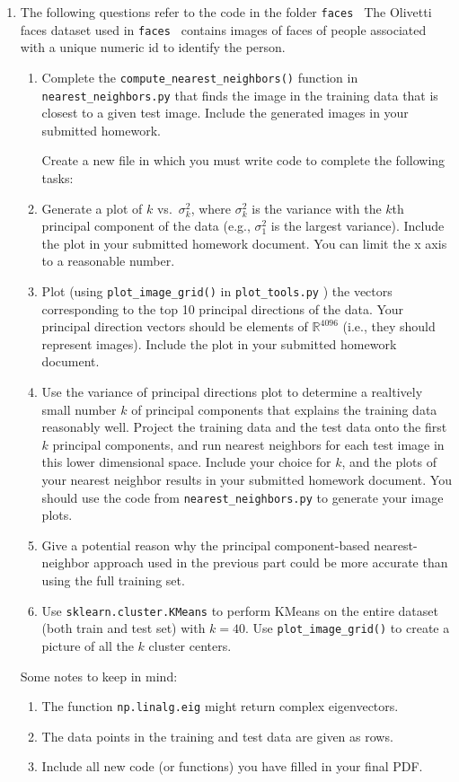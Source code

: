 \documentclass[12pt,twoside]{article}
\begin{document}
\begin{enumerate}
\item The following questions refer to the code in the folder {\tt faces }
  The Olivetti faces dataset used in  {\tt faces }  contains images of faces of people associated with a unique numeric id to identify the person.
 
\begin{enumerate}
\item  Complete the \verb|compute_nearest_neighbors()| function in \verb|nearest_neighbors.py| that finds the image in the training data that is closest to a given test image.  Include the generated images in your submitted homework.


\vspace{0.5cm}Create a new file  in which
you must write code to complete the following tasks:

\item Generate a plot of $k$ vs.~$\sigma^2_k$, where $\sigma^2_k$ is
the variance  with the $k$th principal component of the data (e.g., $\sigma^2_1$
is the largest variance). 
Include
the plot in your submitted homework document. You can limit the x axis to a reasonable number.
\item  Plot (using  \verb|plot_image_grid()| in
\verb|plot_tools.py| ) the vectors
corresponding to the top 10 principal directions of the data.
Your principal direction vectors should be elements of $\mathbb{R}^{4096}$ (i.e., they
should represent images).
Include the plot in your submitted homework document.
\item Use the variance of principal directions plot to determine a 
realtively small number $k$ of principal components
that explains the training data reasonably well.
Project the training data 
and the test data onto the
first $k$ principal components, and run nearest neighbors for
each test image in this lower dimensional space.  Include your
choice for $k$, and the plots
of your nearest neighbor results in your submitted homework
document.  You should use the code from
 \verb|nearest_neighbors.py| to generate your image plots.
\item Give a potential reason why the principal component-based 
nearest-neighbor approach used in the previous part could be
more accurate than using the full training set.
\item Use \verb|sklearn.cluster.KMeans| to perform KMeans on the entire dataset (both train and test set) with $k=40$. Use \verb|plot_image_grid()| to create a picture of all the $k$ cluster centers. 
\end{enumerate}

  Some notes to keep in mind:
  \begin{enumerate}
  \item The function {\tt np.linalg.eig} might return complex eigenvectors.
  \item The data points in the training and test data are given as
    rows.
    \item Include all new code (or functions) you have filled in your final PDF.
 \end{enumerate}
 
 \end{enumerate}
 
\end{document}
